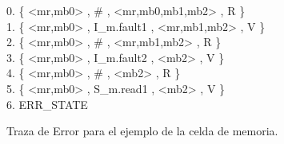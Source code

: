 \begin{figure}[t]
\centering
\begin{minipage}[t]{.47\textwidth}
\fontsize{10}{10}\selectfont\ttfamily
\begin{tabbing}
0. \{ <mr,mb0> , \# , <mr,mb0,mb1,mb2> , R \} \\ 
1. \{ <mr,mb0> , I\_m.fault1 , <mr,mb1,mb2> , V \} \\ 
2. \{ <mr,mb0> , \# , <mr,mb1,mb2> , R \} \\ 
3. \{ <mr,mb0> , I\_m.fault2 , <mb2> , V \} \\ 
4. \{ <mr,mb0> , \# , <mb2> , R \} \\ 
5. \{ <mr,mb0> , S\_m.read1 , <mb2> , V \} \\ 
6. ERR\_STATE \\ 
\end{tabbing}
\end{minipage}
\caption{Traza de Error para el ejemplo de la celda de memoria.} \label{fig:trace_mem_cell}
\end{figure}